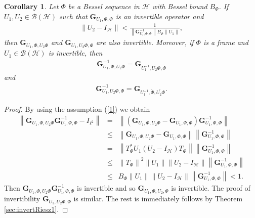 \documentclass{birkjour}
\newtheorem{cor}[thm]{Corollary}
\theoremstyle{definition}
\theoremstyle{remark}
\numberwithin{equation}{section}
\newcommand{\BL}[1]{
{\mathcal B} \left( #1 \right)
}
\begin{document}
\begin{cor}
Let $\Phi$ be a Bessel sequence in $\mathcal{H}$  with Bessel
bound $B_{\Phi}$. If $U_{1},U_{2}\in \BL{\mathcal{H}}$ such that
$\mathbf{G}_{U_{1},\Phi,\Phi}$ is an invertible operator  and
\begin{eqnarray}\label{1}
\left\|U_{2}-I_{\mathcal{H}}\right\|< \frac{1}{\left\|\mathbf{G}_{U_{1},\Phi,\Phi}^{-1}\right\|B_{\Phi}\|U_{1}\|},
\end{eqnarray}
then   $\mathbf{G}_{U_{1},\Phi,U_{2}\Phi}$  and
$\mathbf{G}_{U_{1},U_{2}\Phi,\Phi}$
 are also invertible.  Moreover, if $\Phi$ is a frame and $U_{1}\in \BL{\mathcal{H}}$ is invertible, then
 \begin{eqnarray*}
 \mathbf{G}_{U_{1},\Phi,U_2\Phi}^{-1}=\mathbf{G}_{U_1^{-1},\widetilde{U_2\Phi},\widetilde{\Phi}}
 \end{eqnarray*} and
 \begin{eqnarray*}
 \mathbf{G}_{U_{1},U_2\Phi,\Phi}^{-1}=\mathbf{G}_{U_1^{-1},\widetilde{\Phi},\widetilde{U_2\Phi}}.
 \end{eqnarray*}
\end{cor}
\begin{proof}
 By using the assumption (\ref{1}) we obtain
\begin{eqnarray*}
\left\|\mathbf{G}_{U_{1},\Phi,U_{2}\Phi}\mathbf{G}_{U_{1},\Phi,\Phi}^{-1}- I_{\ell^{2}}\right\|&=&\left\|\left(\mathbf{G}_{U_{1},\Phi,U_{2}\Phi}-\mathbf{G}_{U_{1},\Phi,\Phi}\right)\mathbf{G}_{U_{1},\Phi,\Phi}^{-1}\right\|\\
&\leq&\left\|\mathbf{G}_{U_{1},\Phi,U_{2}\Phi}-\mathbf{G}_{U_{1},\Phi,\Phi}\right\|\left\|\mathbf{G}_{U_{1},\Phi,\Phi}^{-1}\right\|\\
&=&\left\|T_{\Phi}^{*}U_{1}\left(U_{2}-I_{\mathcal{H}}\right)T_{\Phi}\right\|\left\|\mathbf{G}_{U_{1},\Phi,\Phi}^{-1}\right\|\\
&\leq& \left\|T_{\Phi}\right\|^{2}\|U_{1}\|\left\|U_{2}-I_{\mathcal{H}}\right\|\left\|\mathbf{G}_{U_{1},\Phi,\Phi}^{-1}\right\|\\
&\leq&B_{\Phi}\|U_{1}\|\left\|U_{2}-I_{\mathcal{H}}\right\|\left\|\mathbf{G}_{U_{1},\Phi,\Phi}^{-1}\right\|< 1.
\end{eqnarray*}
Then $\mathbf{G}_{U_{1},\Phi,U_{2}\Phi}\mathbf{G}_{U_{1},\Phi,\Phi}^{-1}$ is invertible and so $\mathbf{G}_{U_{1},\Phi,U_{2},\Phi}$ is invertible.
The proof of invertibility $\mathbf{G}_{U_{1},U_{2}\Phi,\Phi}$ is similar. The rest is immediately follows by Theorem \ref{sec:invertRiesz1}.
\end{proof}
\end{document}
